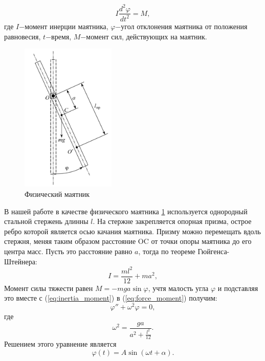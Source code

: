 \documentclass[13pt,a4paper]{article}
\begin{document}
\begin{equation}
	I\frac{d^2\varphi}{dt^2}=M,
	\label{eq:force_moment}
\end{equation}
где $I$$-$момент инерции маятника, $\varphi$$-$угол отклонения маятника от положения равновесия, $t$$-$время, $M$$-$момент сил, действующих на маятник.\\
\begin{figure}
   		\includegraphics[width=0.4\textwidth]{physpend}
    	\caption{Физический маятник}
    	\label{ris:physpend}
\end{figure}
В нашей работе в качестве физического маятника \ref{ris:physpend} используется однородный стальной стержень длинны $l$. На стержне закрепляется опорная призма, острое ребро которой является осью качания маятника. Призму можно перемещать вдоль стержня, меняя таким образом расстояние OC от точки опоры маятника до его центра масс. Пусть это расстояние равно $a$, тогда по теореме Гюйгенса-Штейнера:
\begin{equation}
	I=\frac{ml^2}{12}+ma^2,
	\label{eq:inertia_moment}
\end{equation}
Момент силы тяжести равен $M=-mga\sin\varphi$, учтя малость угла $\varphi$ и подставляя это вместе с (\ref{eq:inertia_moment}) в (\ref{eq:force_moment}) получим:
\begin{equation}
	\varphi''+\omega^2\varphi=0,
	\label{eq:osc}
\end{equation}
где 
\begin{equation}
	\omega^2=\frac{ga}{a^2+\frac{l^2}{12}}.
	\label{eq:osc_omega}
\end{equation}
Решением этого уравнение является
\begin{equation}
	\varphi(t)=A\sin(\omega t+\alpha).
	\label{eq:osc_main}
\end{equation}
\end{document}

